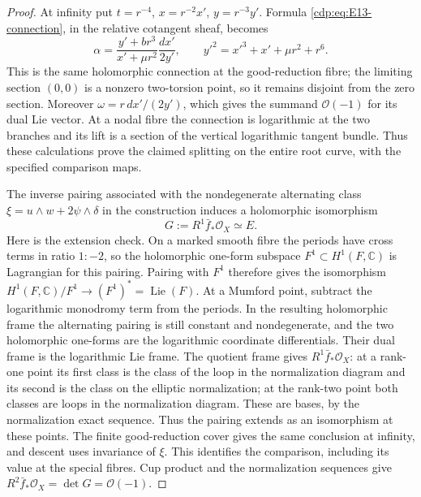 \begin{proof}
At infinity put $t=r^{-4}$, $x=r^{-2}x'$, $y=r^{-3}y'$. Formula
\eqref{cdp:eq:E13-connection}, in the relative cotangent sheaf, becomes
\[
 \alpha=\frac{y'+br^3}{x'+\mu r^2}\frac{dx'}{2y'},
 \qquad y'^2=x'^3+x'+\mu r^2+r^6.
\]
This is the same holomorphic connection at the good-reduction
fibre; the limiting section $(0,0)$ is a nonzero two-torsion point,
so it remains disjoint from the zero section. Moreover
$\omega=r\,dx'/(2y')$, which gives the summand $\mathcal O(-1)$
for its dual Lie vector. At a nodal fibre the connection is
logarithmic at the two branches and its lift is a section of the
vertical logarithmic tangent bundle. Thus these calculations prove
the claimed splitting on the entire root curve, with the specified
comparison maps.

The inverse pairing associated with the nondegenerate alternating
class $\xi=u\wedge w+2\psi\wedge\delta$ in the construction induces a
holomorphic isomorphism
\[
 G:=R^1\bar f_*\mathcal O_X\simeq E.
\]
Here is the extension check. On a marked smooth fibre the periods
have cross terms in ratio $1:-2$, so the holomorphic one-form
subspace $F^1\subset H^1(F,\mathbb C)$ is Lagrangian for this pairing.
Pairing with $F^1$ therefore gives the isomorphism
$H^1(F,\mathbb C)/F^1\to(F^1)^*=\operatorname{Lie}(F)$.
At a Mumford point, subtract the logarithmic monodromy term from the
periods. In the resulting holomorphic frame the alternating pairing
is still constant and nondegenerate, and the two holomorphic
one-forms are the logarithmic coordinate differentials. Their dual
frame is the logarithmic Lie frame. The quotient frame gives
$R^1\bar f_*\mathcal O_X$: at a rank-one point its first class is
the class of the loop in the normalization diagram and its second
is the class on the elliptic normalization; at the rank-two point
both classes are loops in the normalization diagram. These are
bases, by the normalization exact sequence. Thus the pairing extends
as an isomorphism at these points. The finite good-reduction cover
gives the same conclusion at infinity, and descent uses invariance
of $\xi$. This identifies the comparison, including its value at
the special fibres. Cup product and the normalization sequences
give $R^2\bar f_*\mathcal O_X=\det G=\mathcal O(-1)$.


\end{proof}
